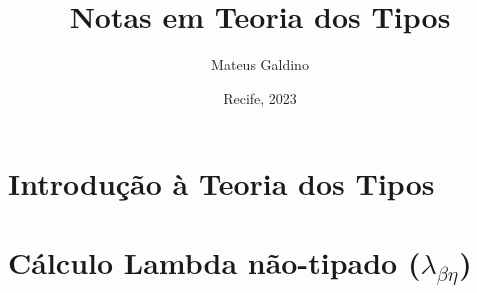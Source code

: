 \documentclass{article}
\title{Notas em Teoria dos Tipos}
\author{Mateus Galdino}
\date{Recife, 2023}
\theoremstyle{definition}
\begin{document}
    \maketitle

    \tableofcontents

    \newpage

        

    \newpage

    \section{Introdução à Teoria dos Tipos}
        
    \newpage

    \section{Cálculo Lambda não-tipado ($\lambda_{\beta\eta}$)}
        
    \newpage
\end{document}
